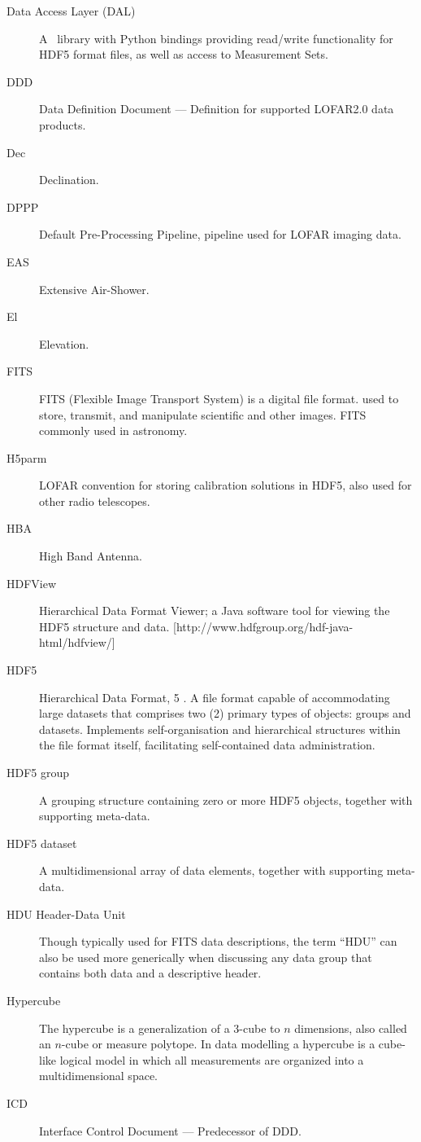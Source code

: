 \begin{description}
\item[Data Access Layer (DAL)] A \cpp\ library with Python bindings
  providing read/write functionality for HDF5 format files, as well as
  access to Measurement Sets.
\item[DDD] Data Definition Document --- Definition for supported LOFAR2.0 data products.
\item[Dec] Declination.
\item[DPPP] Default Pre-Processing Pipeline, pipeline used for LOFAR
  imaging data.
\item[EAS] Extensive Air-Shower.
\item[El] Elevation.
\item[FITS] FITS (Flexible Image Transport System) is a digital file format.   used to store, transmit, and manipulate scientific and other images. FITS
  commonly used in astronomy.
\item[H5parm] LOFAR convention for storing calibration solutions in HDF5, also used for other radio telescopes.
\item[HBA] High Band Antenna.
\item[HDFView] Hierarchical Data Format Viewer;  a Java software tool
  for viewing the HDF5 structure and
  data. [http://www.hdfgroup.org/hdf-java-html/hdfview/]
\item[HDF5] Hierarchical Data Format, 5 \cite{hdf5}. A file format capable of
  accommodating large datasets that comprises two (2) primary types of
  objects: groups and datasets. Implements self-organisation and
  hierarchical structures within the file format itself, facilitating
  self-contained data administration. \cite{hdf5.rm,hdf5.ug}
\item[HDF5 group] A grouping structure containing zero or more HDF5
  objects, together with supporting meta-data.
\item[HDF5 dataset] A multidimensional array of data elements,
  together with supporting meta-data.
\item[HDU Header-Data Unit] Though typically used for FITS data
  descriptions, the term ``HDU'' can also be used more generically when
  discussing any data group that contains both data and a descriptive
  header.
\item[Hypercube] The hypercube is a generalization of a 3-cube to $n$
  dimensions, also called an $n$-cube or measure polytope. In data
  modelling a hypercube is a cube-like logical model in which all
  measurements are organized into a multidimensional space.
\item[ICD] Interface Control Document --- Predecessor of DDD.

\end{description}
